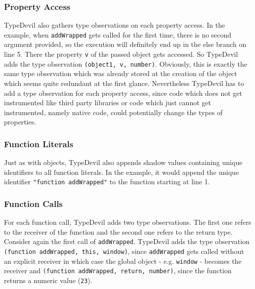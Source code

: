 \documentclass[runningheads,a4paper]{llncs}
\begin{document}
\subsubsection{Property Access}
TypeDevil also gathers type observations on each property access.
In the example, when \lstinline[columns=fixed]{addWrapped} gets called for the first time, there is no second argument provided, so the execution will definitely end up in the else branch on line 5. 
There the property \lstinline[columns=fixed]{v} of the passed object gets accessed.
So TypeDevil adds the type observation \lstinline[columns=fixed]{(object1, v, number)}.
Obviously, this is exactly the same type observation which was already stored at the creation of the object which seems quite redundant at the first glance. 
Nevertheless TypeDevil has to add a type observation for each property access, since code which does not get instrumented like third party libraries or code which just cannot get instrumented, namely native code, could potentially change the types of properties.

\subsubsection{Function Literals}
Just as with objects, TypeDevil also appends shadow values containing unique identifiers to all function literals.
In the example, it would append the unique identifier \lstinline[columns=fixed]{"function addWrapped"} to the function starting at line 1.

\subsubsection{Function Calls}
For each function call, TypeDevil adds two type observations.
The first one refers to the receiver of the function and the second one refers to the return type.
Consider again the first call of \lstinline[columns=fixed]{addWrapped}.
TypeDevil adds the type observation \lstinline[columns=fixed]{(function addWrapped, this, window)}, since \lstinline[columns=fixed]{addWrapped} gets called without an explicit receiver in which case the global object - e.g. \lstinline[columns=fixed]{window} - becomes the receiver
and \lstinline[columns=fixed]{(function addWrapped, return, number)}, since the function returns a numeric value (\lstinline[columns=fixed]{23}).
\end{document}
